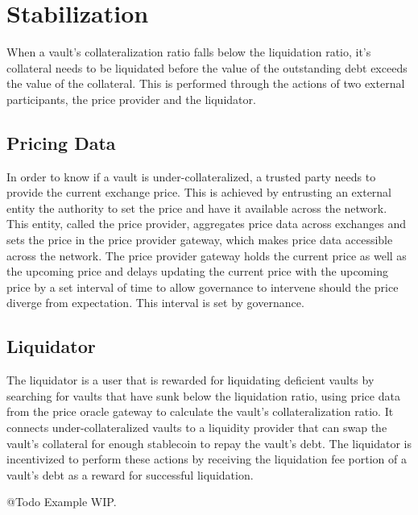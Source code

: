 \documentclass[12pt]{article}
\begin{document}
\section{Stabilization}
When a vault's collateralization ratio falls below the liquidation ratio, it's collateral needs to be liquidated before the value of the outstanding debt exceeds the value of the collateral. This is performed through the actions of two external participants, the price provider and the liquidator.

\subsection{Pricing Data}
In order to know if a vault is under-collateralized, a trusted party needs to provide the current exchange price. This is achieved by entrusting an external entity the authority to set the price and have it available across the network. This entity, called the price provider, aggregates price data across exchanges and sets the price in the price provider gateway, which makes price data accessible across the network. The price provider gateway holds the current price as well as the upcoming price and delays updating the current price with the upcoming price by a set interval of time to allow governance to intervene should the price diverge from expectation. This interval is set by governance.

\subsection{Liquidator}

The liquidator is a user that is rewarded for liquidating deficient vaults by searching for vaults that have sunk below the liquidation ratio, using price data from the price oracle gateway to calculate the vault's collateralization ratio. It connects under-collateralized vaults to a liquidity provider that can swap the vault's collateral for enough stablecoin to repay the vault's debt. The liquidator is incentivized to perform these actions by receiving the liquidation fee portion of a vault's debt as a reward for successful liquidation.

\begin{flushleft}
	\color{red} @Todo Example WIP.
\end{flushleft}
\end{document}
